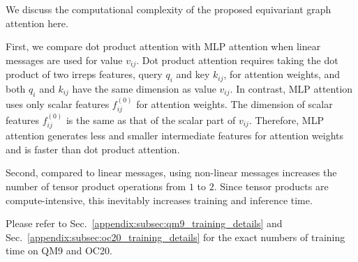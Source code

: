 We discuss the computational complexity of the proposed equivariant graph attention here.

First, we compare dot product attention with MLP attention when linear messages are used for value $v_{ij}$.
Dot product attention requires taking the dot product of two irreps features, query $q_i$ and key $k_{ij}$, for attention weights, and both $q_i$ and $k_{ij}$ have the same dimension as value $v_{ij}$.
In contrast, MLP attention uses only scalar features $f_{ij}^{(0)}$ for attention weights.
The dimension of scalar features $f_{ij}^{(0)}$ is the same as that of the scalar part of $v_{ij}$.
Therefore, MLP attention generates less and smaller intermediate features for attention weights and is faster than dot product attention.

Second, compared to linear messages, using non-linear messages increases the number of tensor product operations from $1$ to $2$.
Since tensor products are compute-intensive, this inevitably increases training and inference time.

Please refer to Sec.~\ref{appendix:subsec:qm9_training_details} and Sec.~\ref{appendix:subsec:oc20_training_details} for the exact numbers of training time on QM9 and OC20.